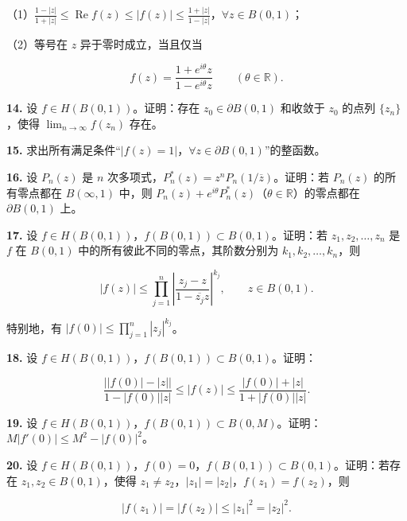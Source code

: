 \documentclass[11pt,a4paper]{article}
\begin{document}
（1）\(\displaystyle\frac{1-|z|}{1+|z|}\le\operatorname{Re}f(z)\le|f(z)|\le\frac{1+|z|}{1-|z|}\)，\(\forall z\in B(0,1)\)；

（2）等号在 \(z\) 异于零时成立，当且仅当

\[
f(z)=\frac{1+e^{i\theta}z}{1-e^{i\theta}z}\qquad(\theta\in\mathbb R).
\]

\par{}
\noindent\textbf{14.} 设 \(f\in H(B(0,1))\)。证明：存在 \(z_0\in\partial B(0,1)\)
和收敛于 \(z_0\) 的点列 \(\{z_n\}\)，使得 \(\lim_{n\to\infty}f(z_n)\)
存在。

\par{}
\noindent\textbf{15.}
求出所有满足条件``\(|f(z)=1|\)，\(\forall z\in\partial B(0,1)\)''的整函数。

\par{}
\noindent\textbf{16.} 设 \(P_n(z)\) 是 \(n\)
次多项式，\(P_n^*(z)=z^nP_n(1/\overline z)\)。证明：若 \(P_n(z)\)
的所有零点都在 \(B(\infty,1)\) 中，则
\(P_n(z)+e^{i\theta}P_n^*(z)\)（\(\theta\in\mathbb R\)）的零点都在
\(\partial B(0,1)\) 上。

\par{}
\noindent\textbf{17.} 设
\(f\in H(B(0,1))\)，\(f(B(0,1))\subset B(0,1)\)。证明：若
\(z_1,z_2,\ldots,z_n\) 是 \(f\) 在 \(B(0,1)\)
中的所有彼此不同的零点，其阶数分别为 \(k_1,k_2,\ldots,k_n\)，则

\[
|f(z)|\le\prod_{j=1}^n\left|\frac{z_j-z}{1-\overline{z_j}z}\right|^{k_j},
\qquad z\in B(0,1).
\]

特别地，有 \(|f(0)|\le\prod_{j=1}^n|z_j|^{k_j}\)。

\par{}
\noindent\textbf{18.} 设 \(f\in H(B(0,1))\)，\(f(B(0,1))\subset B(0,1)\)。证明：

\[
\frac{\bigl||f(0)|-|z|\bigr|}{1-|f(0)||z|}
\le|f(z)|\le\frac{|f(0)|+|z|}{1+|f(0)||z|}.
\]

\par{}
\noindent\textbf{19.} 设
\(f\in H(B(0,1))\)，\(f(B(0,1))\subset B(0,M)\)。证明：\(M|f'(0)|\le M^2-|f(0)|^2\)。

\par{}
\noindent\textbf{20.} 设
\(f\in H(B(0,1))\)，\(f(0)=0\)，\(f(B(0,1))\subset B(0,1)\)。证明：若存在
\(z_1,z_2\in B(0,1)\)，使得
\(z_1\ne z_2\)，\(|z_1|=|z_2|\)，\(f(z_1)=f(z_2)\)，则

\[
|f(z_1)|=|f(z_2)|\le|z_1|^2=|z_2|^2.
\]
\end{document}
